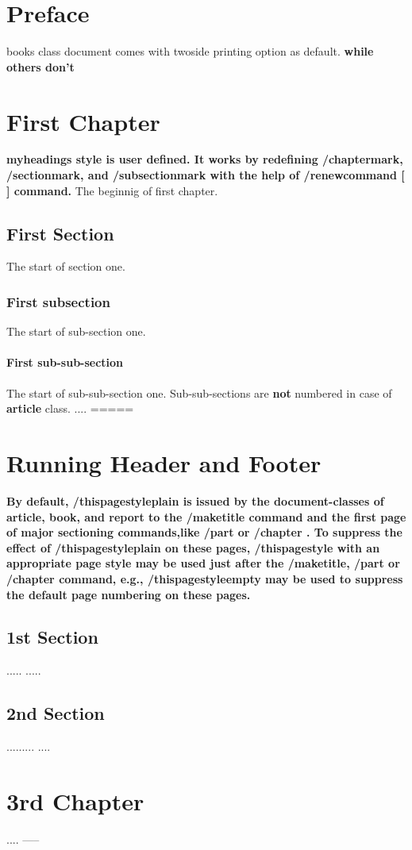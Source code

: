 \documentclass[]{book} %
\begin{document}
\chapter*{Preface}
{\Huge books class document comes with twoside printing option as default. \bf while others don't}

\chapter{First Chapter}
{\huge\bf myheadings style is user defined. It works by redefining /chaptermark, /sectionmark, and /subsectionmark with the help of /renewcommand{ }[ ]{ } command.}
	The beginnig of first chapter.
		\section{First Section}
		The start of section one.
			\subsection{First subsection}
			The start of sub-section one.
				\subsubsection{First sub-sub-section}
					The start of sub-sub-section one. Sub-sub-sections are {\bf\Huge not} numbered in case of {\bf\huge article} class.
					\newpage
					....
                    \newpage
                    =====
\chapter{Running Header and Footer}
\bfseries\large
By default, /thispagestyle{plain} is issued by the document-classes of article, book, and report to the 
/maketitle command and the first page of major sectioning commands,like /part{ } or /chapter{ }. 
To suppress the effect of /thispagestyle{plain} on these pages, /thispagestyle{ } with an appropriate
 page style may be used just after the /maketitle, /part{ } or /chapter{ } command, 
 e.g., /thispagestyle{empty} may be used to suppress the default page numbering on these pages.
    \section{1st Section}
    .....
    \newpage
    .....
    \newpage
    \section{2nd Section}
    .........
    \newpage
    ....
    \chapter{3rd Chapter}
    ....
    \newpage
    -----
\end{document}
